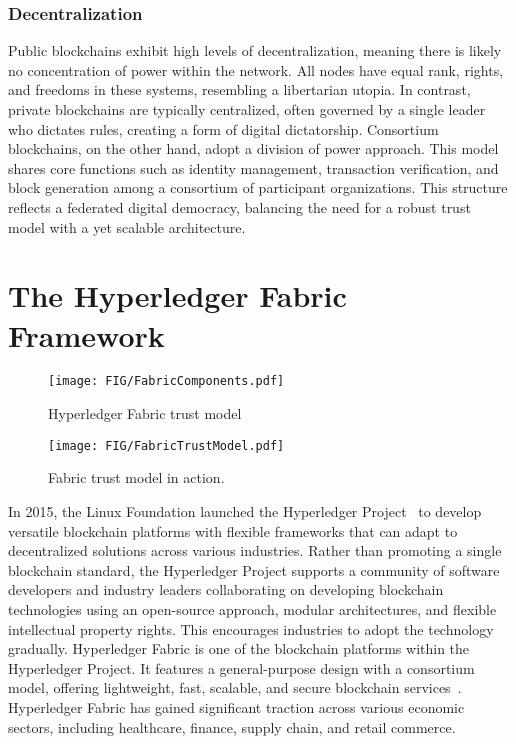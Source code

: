 \documentclass[conference]{IEEEtran}
\begin{document}
\subsubsection{Decentralization} Public blockchains exhibit high levels of decentralization, meaning there is likely no concentration of power within the network. All nodes have equal rank, rights, and freedoms in these systems, resembling a libertarian utopia. In contrast, private blockchains are typically centralized, often governed by a single leader who dictates rules, creating a form of digital dictatorship. Consortium blockchains, on the other hand, adopt a division of power approach. This model shares core functions such as identity management, transaction verification, and block generation among a consortium of participant organizations. This structure reflects a federated digital democracy, balancing the need for a robust trust model with a yet scalable architecture. 
\section{The Hyperledger Fabric Framework}
%
\begin{figure*}[H]
    \centering
    \texttt{[image: FIG/FabricComponents.pdf]}
    \caption{Hyperledger Fabric trust model}
    \label{fig:trustModel}
\end{figure*}
%
%
\begin{figure*}
    \centering
    \texttt{[image: FIG/FabricTrustModel.pdf]}
    \caption{Fabric trust model in action.}
    \label{fig:FabricTrustModel}
\end{figure*}
%
In 2015, the Linux Foundation launched the Hyperledger Project~\cite{02} to develop versatile blockchain platforms with flexible frameworks that can adapt to decentralized solutions across various industries. Rather than promoting a single blockchain standard, the Hyperledger Project supports a community of software developers and industry leaders collaborating on developing blockchain technologies using an open-source approach, modular architectures, and flexible intellectual property rights. This encourages industries to adopt the technology gradually. Hyperledger Fabric is one of the blockchain platforms within the Hyperledger Project. It features a general-purpose design with a consortium model, offering lightweight, fast, scalable, and secure blockchain services~\cite{03}. Hyperledger Fabric has gained significant traction across various economic sectors, including healthcare, finance, supply chain, and retail commerce.\\
\end{document}
